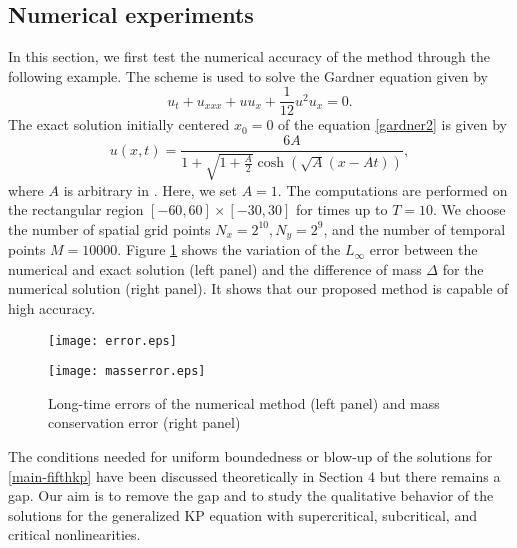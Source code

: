 \documentclass[10pt]{article}
\numberwithin{equation}{section}
\begin{document}
	\subsection{Numerical experiments}
	In this section, we first test the numerical accuracy of the method through the following example. The scheme is used to solve the Gardner equation given by
	\begin{equation}\label{gardner2}
		u_t+u_{xxx}+u u_x+ \frac{1}{12} u^2 u_x=0.
	\end{equation}
	The exact solution initially centered $x_0=0$  of the equation \eqref{gardner2} is  given by 
	\begin{equation}
		u(x,t)=\frac{6A}{1+\sqrt{1+\frac{A}{2}} \cosh \left(\sqrt{A} (x-At)\right)},
	\end{equation}
	where $A$ is arbitrary in \cite{hamdi}. Here, we set $A=1$. The computations are performed on the rectangular 
	region $[-60, 60] \times [-30, 30]$ for times up to $T = 10$. We
	choose the number of spatial grid points $N_x = 2^{10}, N_y=2^9$, and the number of temporal points $M=10000$. 
	Figure \ref{figure_gardner} shows the variation of the 
	$L_{\infty}$ error between the numerical and exact solution  (left panel) and the difference of mass $\Delta$ for the numerical solution (right panel).
	It shows that our proposed method is capable of high accuracy.
	\begin{figure}[!h]
		\begin{minipage}[t]{0.45\linewidth}
			\centering
			\texttt{[image: error.eps]}
		\end{minipage}%
		\hspace{20pt}
		\begin{minipage}[t]{0.45\linewidth}
			\centering
			\texttt{[image: masserror.eps]}
		\end{minipage}
		\caption{Long-time errors of the numerical method (left panel) and mass conservation error (right panel) }\label{figure_gardner}
	\end{figure}
	
	
	\par
	The conditions needed for uniform boundedness or blow-up of the solutions for \eqref{main-fifthkp} have been discussed theoretically in Section $4$ but there remains a gap. Our aim is to remove the gap and to study the qualitative behavior of the solutions for the generalized KP equation with supercritical, subcritical, and critical nonlinearities. 
	
\end{document}
